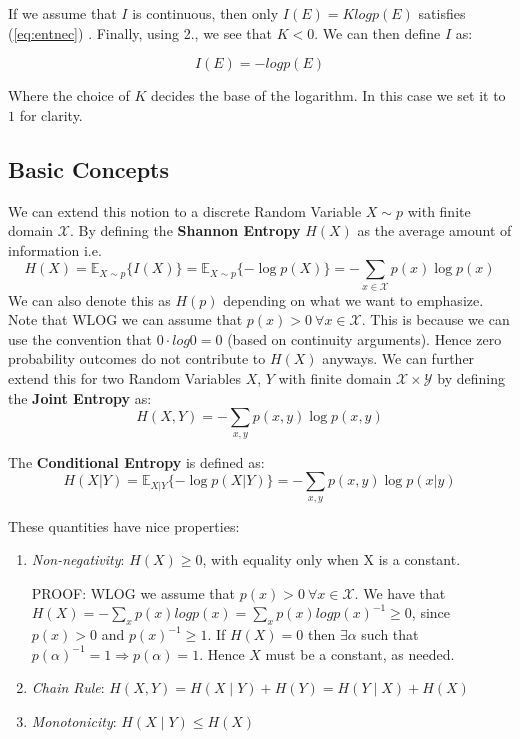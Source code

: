 \documentclass[]{article}
\theoremstyle{mattstyle}
\theoremstyle{definition}
\begin{document}
If we assume that $I$ is continuous, then only $I(E) = Klog p(E)$ satisfies (\ref{eq:entnec})  \cite{EntNotes}. Finally, using 2., we see that $K<0$. We can then define $I$ as:

\begin{equation}
I(E) = -log p(E)
\end{equation}

Where the choice of $K$ decides the base of the logarithm. In this case we set it to $1$ for clarity.

\subsection{Basic Concepts}
We can extend this notion to a discrete Random Variable $X\sim p$ with finite domain $\mathcal{X}$. By defining the \textbf{Shannon Entropy} $H(X)$ as the average amount of information i.e. 
\begin{equation}
H(X) = \mathbb{E}_{X\sim p}\{I(X)\} = \mathbb{E}_{X\sim p}\{-\log p(X)\} = -\sum_{x\in\mathcal{X}}p(x)\log p(x)
\end{equation}
We can also denote this as $H(p)$ depending on what we want to emphasize. Note that WLOG we can assume that \(p(x)>0 \ \forall x\in\mathcal{X}\). This is because we can use the convention that \(0\cdot log0 = 0\) (based on continuity arguments). Hence zero probability outcomes do not contribute to $H(X)$ anyways. We can further extend this for two Random Variables $X$, $Y$ with finite domain \(\mathcal{X}\times\mathcal{Y}\) by defining the \textbf{Joint Entropy} as:
\begin{equation}
H(X,Y) = -\sum_{x,y}p(x,y)\log p(x,y)
\end{equation}

The \textbf{Conditional Entropy} is defined as:
\begin{equation}
H(X|Y) = \mathbb{E}_{X|Y}\{-\log p(X|Y)\} = -\sum_{x,y}p(x,y)\log p(x|y)
\end{equation}

These quantities have nice properties:
\begin{enumerate}
	\item \emph{Non-negativity}: \(H(X)\ge0\), with equality only when X is a constant.
	
	PROOF: WLOG we assume that \(p(x)>0 \ \forall x\in\mathcal{X}\). We have that \(H(X) = -\sum_{x} p(x)logp(x) = \sum_{x} p(x)logp(x)^{-1}\ge0\), since \(p(x)>0\) and \(p(x)^{-1} \ge 1\). If \(H(X)=0\) then \(\exists \alpha\) such that \(p(\alpha)^{-1}=1 \Rightarrow p(\alpha)=1\). Hence \(X\) must be a constant, as needed.
	
	\item \emph{Chain Rule}: $H(X,Y) = H(X \mid Y) + H(Y) = H(Y \mid X) + H(X)$ 
	\item \emph{Monotonicity}: $H(X\mid Y) \le H(X)$ 
\end{enumerate}
\end{document}
